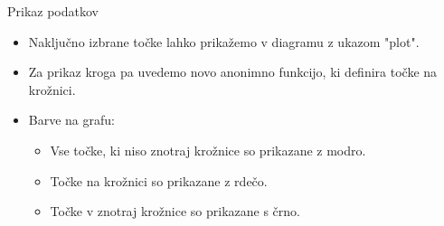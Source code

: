 \begin{frame}{Prikaz podatkov}
     
     \begin{itemize}[<+->]
        \item Naključno izbrane točke lahko prikažemo v diagramu z ukazom "plot".
        \item Za prikaz kroga pa uvedemo novo anonimno funkcijo, ki definira točke na krožnici.
        \item Barve na grafu:
        \begin{itemize}[<.->]
            \item Vse točke, ki niso znotraj krožnice so prikazane z modro.
            \item Točke na krožnici so prikazane z rdečo.
            \item Točke v znotraj krožnice so prikazane s črno.
        \end{itemize}
        
     \end{itemize}
    
\end{frame}